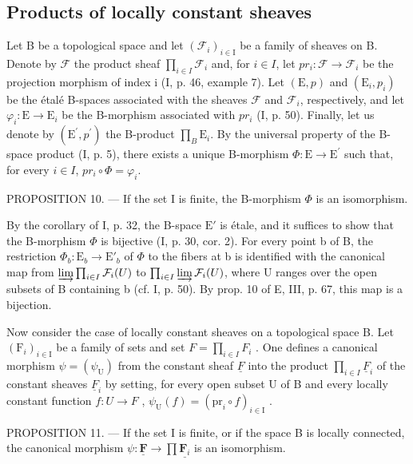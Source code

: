 \subsection{Products of locally constant sheaves}

Let B be a topological space and let \((\mathcal{F}_{i})_{i\in\mathrm{I}}\) be a family of sheaves on B. Denote by \(\mathcal{F}\) the product sheaf \(\prod_{i\in I}\mathcal{F}_{i}\) and, for \(i\in I\), let \(pr_{i}\colon \mathcal{F}\to\mathcal{F}_{i}\) be the projection morphism of index i (I, p. 46, example 7). Let \((\mathrm{E},p)\) and \((\mathrm{E}_{i},p_{i})\) be the étalé B-spaces associated with the sheaves \(\mathcal{F}\) and \(\mathcal{F}_{i}\), respectively, and let \(\varphi_{i}\colon \mathrm{E}\to \mathrm{E}_{i}\) be the B-morphism associated with \(pr_{i}\) (I, p. 50). Finally, let us denote by \((\mathrm{E}^{\prime},p^{\prime})\) the B-product \(\prod_{B}\mathrm{E}_{i}\). By the universal property of the B-space product (I, p. 5), there exists a unique B-morphism \(\Phi\colon \mathrm{E}\to \mathrm{E}^{\prime}\) such that, for every \(i\in I\), \(pr_{i}\circ\Phi=\varphi_{i}\).

PROPOSITION 10. --- If the set I is finite, the B-morphism \(\Phi\) is an isomorphism.

By the corollary of I, p. 32, the B-space \(\mathrm{E}'\) is étale, and it suffices to show that the B-morphism \(\Phi\) is bijective (I, p. 30, cor. 2). For every point b of B, the restriction \(\Phi_b\colon \mathrm{E}_b\to \mathrm{E}'_b\) of \(\Phi\) to the fibers at b is identified with the canonical map from \(\varinjlim\prod_{i\in I}\mathcal{F}_{i}(U)\) to \(\prod_{i\in I}\varinjlim\mathcal{F}_{i}(U)\), where U ranges over the open subsets of B containing b (cf. I, p. 50). By prop. 10 of E, III, p. 67, this map is a bijection.

Now consider the case of locally constant sheaves on a topological space B. Let \((\mathrm{F}_{i})_{i\in\mathrm{I}}\) be a family of sets and set \(F=\prod_{i\in I}F_{i}\) . One defines a canonical morphism \(\psi=(\psi_{\mathrm{U}})\) from the constant sheaf \(\underline{F}\) into the product \(\prod_{i\in I}\underline{F}_{i}\) of the constant sheaves \(\underline{F}_{i}\) by setting, for every open subset U of B and every locally constant function \(f\colon U\to F\) , \(\psi_{\mathrm{U}}(f)=(\mathrm{pr}_{i}\circ f)_{i\in\mathrm{I}}\) .

PROPOSITION 11. --- If the set I is finite, or if the space B is locally connected, the canonical morphism \(\psi\colon\underline{\mathbf{F}}\to\prod\underline{\mathbf{F}_{i}}\) is an isomorphism.


